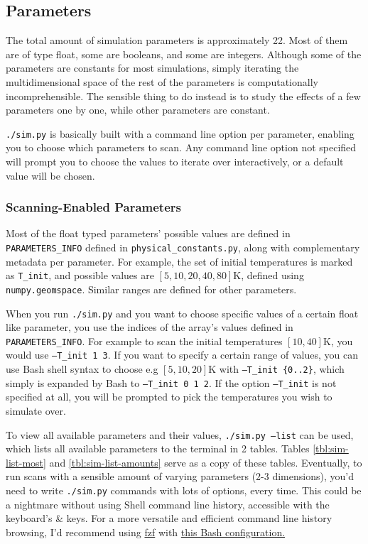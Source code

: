 \subsection{Parameters}

The total amount of simulation parameters is approximately 22. Most of them are of type float, some are booleans, and some are integers. Although some of the parameters are constants for most simulations, simply iterating the multidimensional space of the rest of the parameters is computationally incomprehensible. The sensible thing to do instead is to study the effects of a few parameters one by one, while other parameters are constant.

\texttt{./sim.py} is basically built with a command line option per parameter, enabling you to choose which parameters to scan. Any command line option not specified will prompt you to choose the values to iterate over interactively, or a default value will be chosen.

\subsubsection{Scanning-Enabled Parameters}\label{sssec:manual/multi-value-params}

Most of the float typed parameters' possible values are defined in \texttt{PARAMETERS\_INFO} defined in \texttt{physical\_constants.py}, along with complementary metadata per parameter. For example, the set of initial temperatures is marked as \texttt{T\_init}, and possible values are $[5,10,20,40,80]\mathrm{K}$, defined using \texttt{numpy.geomspace}. Similar ranges are defined for other parameters.

When you run \texttt{./sim.py} and you want to choose specific values of a certain float like parameter, you use the indices of the array's values defined in \texttt{PARAMETERS\_INFO}. For example to scan the initial temperatures $[10,40]\mathrm{K}$, you would use \texttt{--T\_init 1 3}. If you want to specify a certain range of values, you can use Bash shell syntax to choose e.g $[5,10,20]\mathrm{K}$ with \texttt{--T\_init \{0..2\}}, which simply is expanded by Bash to \texttt{--T\_init 0 1 2}. If the option \texttt{--T\_init} is not specified at all, you will be prompted to pick the temperatures you wish to simulate over.

To view all available parameters and their values, \texttt{./sim.py --list} can be used, which lists all available parameters to the terminal in 2 tables. Tables \ref{tbl:sim-list-most} and \ref{tbl:sim-list-amounts} serve as a copy of these tables. Eventually, to run scans with a sensible amount of varying parameters (2-3 dimensions), you'd need to write \texttt{./sim.py} commands with lots of options, every time. This could be a nightmare without using Shell command line history, accessible with the keyboard's \keys{\arrowkeyup} \& \keys{\arrowkeydown} keys. For a more versatile and efficient command line history browsing, I'd recommend using \href{https://github.com/junegunn/fzf}{fzf} with \href{https://github.com/junegunn/fzf/blob/d24b58ef3fc6d6d2c43e07a44e0f757b9bdfbeff/shell/key-bindings.bash#L133-L136}{this Bash configuration.}

